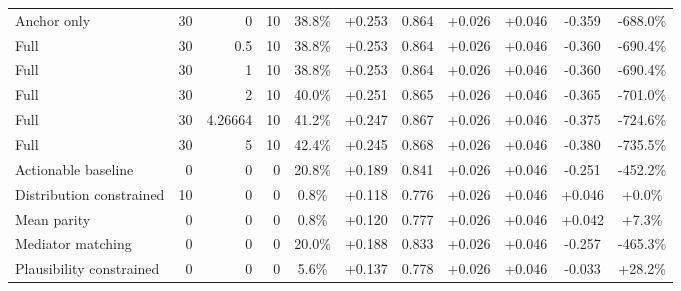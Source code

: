\begin{table}[htbp]
\begin{tabular}{lrrrccccccc}
Anchor only & 30 & 0 & 10 & 38.8\% & +0.253 & 0.864 & +0.026 & +0.046 & -0.359 & -688.0\% \\
Full & 30 & 0.5 & 10 & 38.8\% & +0.253 & 0.864 & +0.026 & +0.046 & -0.360 & -690.4\% \\
Full & 30 & 1 & 10 & 38.8\% & +0.253 & 0.864 & +0.026 & +0.046 & -0.360 & -690.4\% \\
Full & 30 & 2 & 10 & 40.0\% & +0.251 & 0.865 & +0.026 & +0.046 & -0.365 & -701.0\% \\
Full & 30 & 4.26664 & 10 & 41.2\% & +0.247 & 0.867 & +0.026 & +0.046 & -0.375 & -724.6\% \\
Full & 30 & 5 & 10 & 42.4\% & +0.245 & 0.868 & +0.026 & +0.046 & -0.380 & -735.5\% \\
Actionable baseline & 0 & 0 & 0 & 20.8\% & +0.189 & 0.841 & +0.026 & +0.046 & -0.251 & -452.2\% \\
Distribution constrained & 10 & 0 & 0 & 0.8\% & +0.118 & 0.776 & +0.026 & +0.046 & +0.046 & +0.0\% \\
Mean parity & 0 & 0 & 0 & 0.8\% & +0.120 & 0.777 & +0.026 & +0.046 & +0.042 & +7.3\% \\
Mediator matching & 0 & 0 & 0 & 20.0\% & +0.188 & 0.833 & +0.026 & +0.046 & -0.257 & -465.3\% \\
Plausibility constrained & 0 & 0 & 0 & 5.6\% & +0.137 & 0.778 & +0.026 & +0.046 & -0.033 & +28.2\% \\
\bottomrule
\end{tabular}
\end{table}